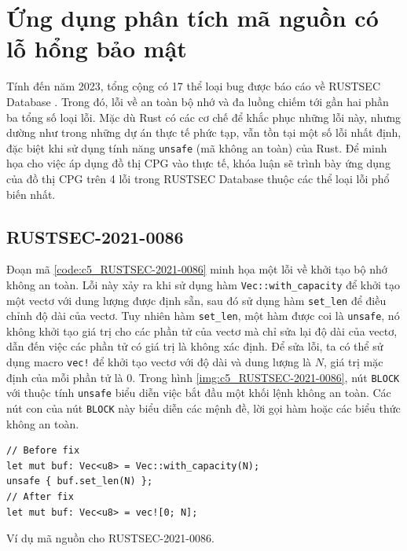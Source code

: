 \section{Ứng dụng phân tích mã nguồn có lỗ hổng bảo mật}

Tính đến năm 2023, tổng cộng có 17 thể loại bug được báo cáo về RUSTSEC Database \cite{zheng2023closer}.
Trong đó, lỗi về an toàn bộ nhớ và đa luồng chiếm tới gần hai phần ba tổng số loại lỗi.
Mặc dù Rust có các cơ chế để khắc phục những lỗi này, nhưng dường như trong những dự án thực tế phức tạp, vẫn tồn tại một số lỗi nhất định, đặc biệt khi sử dụng tính năng \texttt{unsafe} (mã không an toàn) của Rust.
Để minh họa cho việc áp dụng đồ thị CPG vào thực tế, khóa luận sẽ trình bày ứng dụng của đồ thị CPG trên 4 lỗi trong RUSTSEC Database thuộc các thể loại lỗi phổ biến nhất.

\subsection{RUSTSEC-2021-0086}

Đoạn mã \ref{code:c5_RUSTSEC-2021-0086} minh họa một lỗi về khởi tạo bộ nhớ không an toàn.
Lỗi này xảy ra khi sử dụng hàm \texttt{Vec::with\_capacity} để khởi tạo một vectơ với dung lượng được định sẵn, sau đó sử dụng hàm \texttt{set\_len} để điều chỉnh độ dài của vectơ.
Tuy nhiên hàm \texttt{set\_len}, một hàm được coi là \texttt{unsafe}, nó không khởi tạo giá trị cho các phần tử của vectơ mà chỉ sửa lại độ dài của vectơ, dẫn đến việc các phần tử có giá trị là không xác định.
Để sửa lỗi, ta có thể sử dụng macro \texttt{vec!} để khởi tạo vectơ với độ dài và dung lượng là $N$, giá trị mặc định của mỗi phần tử là $0$.
Trong hình \ref{img:c5_RUSTSEC-2021-0086}, nút \texttt{BLOCK} với thuộc tính \texttt{unsafe} biểu diễn việc bắt đầu một khối lệnh không an toàn. Các nút con của nút \texttt{BLOCK} này biểu diễn các mệnh đề, lời gọi hàm hoặc các biểu thức không an toàn.

\begin{listing}[H]
\begin{verbatim}
// Before fix
let mut buf: Vec<u8> = Vec::with_capacity(N);
unsafe { buf.set_len(N) };
// After fix
let mut buf: Vec<u8> = vec![0; N];
\end{verbatim}
\caption{Ví dụ mã nguồn cho RUSTSEC-2021-0086.}
\label{code:c5_RUSTSEC-2021-0086}
\end{listing}

